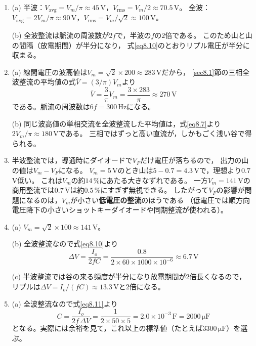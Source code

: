 \answer
\begin{enumerate}

\item[\ref{ex8.1}]
(a) 半波：$V_{\mathrm{avg}} = V_m/\pi \approx 45$\,V，$V_{\mathrm{rms}} = V_m/2 \approx 70.5$\,V。
全波：$V_{\mathrm{avg}} = 2V_m/\pi \approx 90$\,V，$V_{\mathrm{rms}} = V_m/\sqrt{2} \approx 100$\,V。

(b) 全波整流は脈流の周波数が$2f$で，半波の$f$の$2$倍である。
このため山と山の間隔（放電期間）が半分になり，
式\ref{eq8.10}のとおりリプル電圧が半分に収まる。

\item[\ref{ex8.2}]
(a) 線間電圧の波高値は$V_m = \sqrt{2}\times200 \approx 283$\,Vだから，
\ref{sec8.1}節の三相全波整流の平均値の式$\bar{V} = (3/\pi)V_m$より
\begin{equation*}
\bar{V} = \frac{3}{\pi}V_m = \frac{3\times283}{\pi} \approx 270\,\mathrm{V}
\end{equation*}
である。脈流の周波数は$6f = 300$\,Hzになる。

(b) 同じ波高値の単相交流を全波整流した平均値は，式\ref{eq8.7}より$2V_m/\pi \approx 180$\,Vである。
三相ではずっと高い直流が，しかもごく浅い谷で得られる。

\item[\ref{ex8.3}]
半波整流では，導通時にダイオードで$V_F$だけ電圧が落ちるので，
出力の山の値は$V_m - V_F$になる。
$V_m = 5$\,Vのとき山は$5 - 0.7 = 4.3$\,Vで，理想より$0.7$\,V低い。
これは$V_m$の約$14\,\%$にあたる大きなずれである。
一方$V_m = 141$\,Vの商用整流では$0.7$\,Vは約$0.5\,\%$にすぎず無視できる。
したがって$V_F$の影響が問題になるのは，$V_m$が小さい\textbf{低電圧の整流}のほうである
（低電圧では順方向電圧降下の小さいショットキーダイオードや同期整流が使われる）。

\item[\ref{ex8.4}]
(a) $V_m = \sqrt{2}\times100 \approx 141$\,V。

(b) 全波整流なので式\ref{eq8.10}より
\begin{equation*}
\mathit{\Delta}V = \frac{I_o}{2 f C}
= \frac{0.8}{2\times60\times1000\times10^{-6}} \approx 6.7\,\mathrm{V}
\end{equation*}

(c) 半波整流では谷の来る頻度が半分になり放電期間が$2$倍長くなるので，
リプルは$\mathit{\Delta}V = I_o/(fC) \approx 13.3$\,Vと$2$倍になる。

\item[\ref{ex8.5}]
(a) 全波整流なので式\ref{eq8.11}より
\begin{equation*}
C = \frac{I_o}{2 f\, \mathit{\Delta}V} = \frac{1}{2\times50\times5} = 2.0\times10^{-3}\,\mathrm{F} = 2000\,\mathrm{\mu F}
\end{equation*}
となる。実際には余裕を見て，これ以上の標準値（たとえば$3300\,\mathrm{\mu F}$）を選ぶ。


\end{enumerate}
